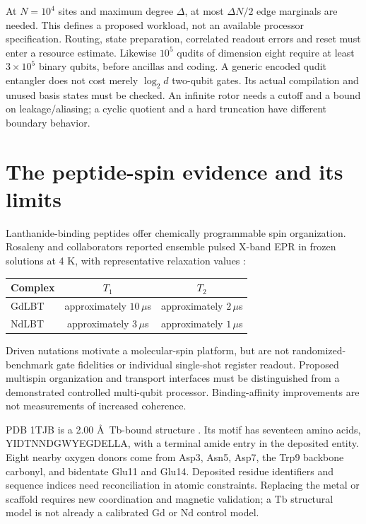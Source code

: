 \documentclass[11pt,oneside,openany]{book}
\theoremstyle{definition}\newtheorem{definition}[theorem]{Definition}
\theoremstyle{remark}\newtheorem{remark}[theorem]{Remark}
\begin{document}
At $N=10^4$ sites and maximum degree $\Delta$, at most $\Delta N/2$
edge marginals are needed. This defines a proposed workload, not an
available processor specification. Routing, state preparation, correlated
readout errors and reset must enter a resource estimate. Likewise $10^5$
qudits of dimension eight require at least $3\times10^5$ binary qubits,
before ancillas and coding. A generic encoded qudit entangler does not
cost merely $\log_2d$ two-qubit gates. Its actual compilation and unused
basis states must be checked. An infinite rotor needs a cutoff and a
bound on leakage/aliasing; a cyclic quotient and a hard truncation have
different boundary behavior.

\section{The peptide-spin evidence and its limits}
Lanthanide-binding peptides offer chemically programmable spin organization.
Rosaleny and collaborators reported ensemble pulsed X-band EPR in frozen
solutions at 4 K, with representative relaxation values
\cite{PhysRosaleny}:
\begin{center}
\begin{tabular}{lcc}
\toprule
Complex & $T_1$ & $T_2$\\\midrule
GdLBT & approximately $10\,\mu$s & approximately $2\,\mu$s\\
NdLBT & approximately $3\,\mu$s & approximately $1\,\mu$s\\\bottomrule
\end{tabular}
\end{center}
Driven nutations motivate a molecular-spin platform, but are not
randomized-benchmark gate fidelities or individual single-shot register
readout. Proposed multispin organization and transport interfaces must
be distinguished from a demonstrated controlled multi-qubit processor.
Binding-affinity improvements are not measurements of increased coherence.

PDB 1TJB is a 2.00 \AA\ Tb-bound structure \cite{PhysNitz}. Its motif has
seventeen amino acids, YIDTNNDGWYEGDELLA, with a terminal amide entry in
the deposited entity. Eight nearby oxygen donors come from Asp3, Asn5,
Asp7, the Trp9 backbone carbonyl, and bidentate Glu11 and Glu14. Deposited
residue identifiers and sequence indices need reconciliation in atomic
constraints. Replacing the metal or scaffold requires new coordination
and magnetic validation; a Tb structural model is not already a calibrated
Gd or Nd control model.
\end{document}
